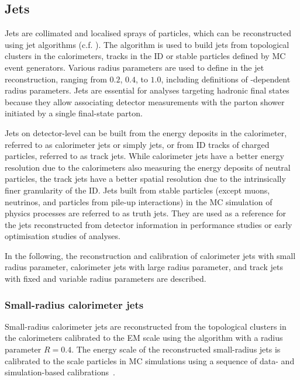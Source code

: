\subsection{Jets}
\label{sec:methods:event-reconstruction:jets}
Jets are collimated and localised sprays of particles, which can be reconstructed using jet algorithms (c.f. ). The \antikt algorithm is used to build jets from topological clusters in the calorimeters, tracks in the ID or stable particles defined by MC event generators. Various radius parameters are used to define in the jet reconstruction, ranging from \(0.2\), \(0.4\), to \(1.0\), including definitions of \pt-dependent radius parameters.
Jets are essential for analyses targeting hadronic final states because they allow associating detector measurements with the parton shower initiated by a single final-state parton.

Jets on detector-level can be built from the energy deposits in the calorimeter, referred to as calorimeter jets or simply jets, or from ID tracks of charged particles, referred to as track jets. While calorimeter jets have a better energy resolution due to the calorimeters also measuring the energy deposits of neutral particles, the track jets have a better spatial resolution due to the intrinsically finer granularity of the ID.
Jets built from stable particles (except muons, neutrinos, and particles from pile-up interactions) in the MC simulation of physics processes are referred to as truth jets. They are used as a reference for the jets reconstructed from detector information in performance studies or early optimisation studies of analyses.

In the following, the reconstruction and calibration of calorimeter jets with small radius parameter, calorimeter jets with large radius parameter, and track jets with fixed and variable radius parameters are described.

\subsubsection{Small-radius calorimeter jets}
\label{sec:methods:event-reconstruction:jets:smallr}
Small-radius calorimeter jets are reconstructed from the topological clusters in the calorimeters calibrated to the EM scale using the \antikt algorithm with a radius parameter \(R=0.4\). The energy scale of the reconstructed small-radius jets is calibrated to the scale particles in MC simulations using a sequence of data- and simulation-based calibrations~\cite{PERF-2016-04,JETM-2018-05}.

